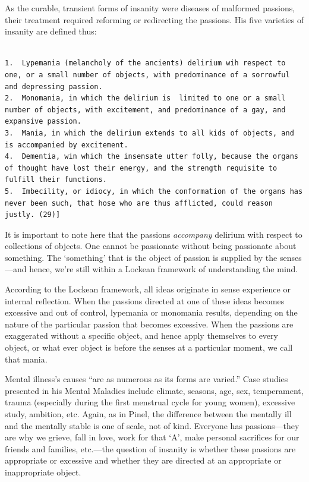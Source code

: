 As the curable, transient forms of insanity were diseases of malformed passions, their treatment required reforming or redirecting the passions. His five varieties of insanity are defined thus:

\begin{adjustwidth}{2.5em}{2.5em}
\begin{verbatim}

1.  Lypemania (melancholy of the ancients) delirium wih respect to one, or a small number of objects, with predominance of a sorrowful and depressing passion.
2.  Monomania, in which the delirium is  limited to one or a small number of objects, with excitement, and predominance of a gay, and expansive passion.
3.  Mania, in which the delirium extends to all kids of objects, and is accompanied by excitement.
4.  Dementia, win which the insensate utter folly, because the organs of thought have lost their energy, and the strength requisite to fulfill their functions.
5.  Imbecility, or idiocy, in which the conformation of the organs has never been such, that hose who are thus afflicted, could reason justly. (29)]

\end{verbatim}
\end{adjustwidth}

It is important to note here that the passions \emph{accompany} delirium with respect to collections of objects. One cannot be passionate without being passionate about something. The `something' that is the object of passion is supplied by the senses---and hence, we're still within a Lockean framework of understanding the mind. 

According to the Lockean framework, all ideas originate in sense experience or internal reflection. When the passions directed at one of these ideas becomes excessive and out of control, lypemania or monomania results, depending on the nature of the particular passion that becomes excessive. When the passions are exaggerated without a specific object, and hence apply themselves to every object, or what ever object is before the senses at a particular moment, we call that mania.

Mental illness's causes “are as numerous as its forms are varied.” Case studies presented in his Mental Maladies include climate, seasons, age, sex, temperament, trauma (especially during the first menstrual cycle for young women), excessive study, ambition, etc. Again, as in Pinel, the difference between the mentally ill and the mentally stable is one of scale, not of kind. Everyone has passions---they are why we grieve, fall in love, work for that `A', make personal sacrifices for our friends and families, etc.---the question of insanity is whether these passions are appropriate or excessive and whether they are directed at an appropriate or inappropriate object.

